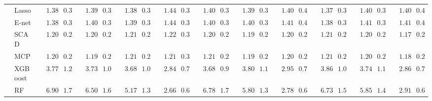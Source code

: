 \begin{tabular}{ll|ll|llllll|llllll|llllll}
 & Lasso  & $\phantom{00}1.38$ & $\phantom{0}0.33$ & $\phantom{00}1.39$ & $\phantom{0}0.36$ & $\phantom{00}1.38$ & $\phantom{0}0.39$ & $\phantom{00}1.44$ & $\phantom{0}0.36$ & $\phantom{00}1.40$ & $\phantom{0}0.33$ & $\phantom{00}1.39$ & $\phantom{0}0.33$ & $\phantom{00}1.40$ & $\phantom{0}0.44$ & $\phantom{00}1.37$ & $\phantom{0}0.36$ & $\phantom{00}1.40$ & $\phantom{0}0.38$ & $\phantom{00}1.40$ & $\phantom{0}0.40$ \\
 & E-net  & $\phantom{00}1.38$ & $\phantom{0}0.33$ & $\phantom{00}1.40$ & $\phantom{0}0.36$ & $\phantom{00}1.39$ & $\phantom{0}0.39$ & $\phantom{00}1.44$ & $\phantom{0}0.35$ & $\phantom{00}1.40$ & $\phantom{0}0.33$ & $\phantom{00}1.40$ & $\phantom{0}0.32$ & $\phantom{00}1.41$ & $\phantom{0}0.44$ & $\phantom{00}1.38$ & $\phantom{0}0.37$ & $\phantom{00}1.41$ & $\phantom{0}0.39$ & $\phantom{00}1.41$ & $\phantom{0}0.40$ \\
 & SCAD  & $\phantom{00}1.20$ & $\phantom{0}0.24$ & $\phantom{00}1.20$ & $\phantom{0}0.26$ & $\phantom{00}1.21$ & $\phantom{0}0.26$ & $\phantom{00}1.22$ & $\phantom{0}0.31$ & $\phantom{00}1.20$ & $\phantom{0}0.26$ & $\phantom{00}1.19$ & $\phantom{0}0.24$ & $\phantom{00}1.20$ & $\phantom{0}0.27$ & $\phantom{00}1.21$ & $\phantom{0}0.27$ & $\phantom{00}1.20$ & $\phantom{0}0.26$ & $\phantom{00}1.17$ & $\phantom{0}0.25$ \\
 & MCP  & $\phantom{00}1.20$ & $\phantom{0}0.25$ & $\phantom{00}1.19$ & $\phantom{0}0.26$ & $\phantom{00}1.21$ & $\phantom{0}0.26$ & $\phantom{00}1.21$ & $\phantom{0}0.30$ & $\phantom{00}1.21$ & $\phantom{0}0.27$ & $\phantom{00}1.19$ & $\phantom{0}0.24$ & $\phantom{00}1.20$ & $\phantom{0}0.27$ & $\phantom{00}1.21$ & $\phantom{0}0.27$ & $\phantom{00}1.20$ & $\phantom{0}0.25$ & $\phantom{00}1.18$ & $\phantom{0}0.26$ \\
 & XGBoost  & $\phantom{00}3.77$ & $\phantom{0}1.23$ & $\phantom{00}3.73$ & $\phantom{0}1.04$ & $\phantom{00}3.68$ & $\phantom{0}1.07$ & $\phantom{00}2.84$ & $\phantom{0}0.77$ & $\phantom{00}3.68$ & $\phantom{0}0.97$ & $\phantom{00}3.80$ & $\phantom{0}1.14$ & $\phantom{00}2.95$ & $\phantom{0}0.73$ & $\phantom{00}3.86$ & $\phantom{0}1.08$ & $\phantom{00}3.74$ & $\phantom{0}1.17$ & $\phantom{00}2.86$ & $\phantom{0}0.73$ \\
 & RF  & $\phantom{00}6.90$ & $\phantom{0}1.76$ & $\phantom{00}6.50$ & $\phantom{0}1.66$ & $\phantom{00}5.17$ & $\phantom{0}1.34$ & $\phantom{00}2.66$ & $\phantom{0}0.65$ & $\phantom{00}6.78$ & $\phantom{0}1.75$ & $\phantom{00}5.80$ & $\phantom{0}1.32$ & $\phantom{00}2.78$ & $\phantom{0}0.63$ & $\phantom{00}6.73$ & $\phantom{0}1.53$ & $\phantom{00}5.85$ & $\phantom{0}1.47$ & $\phantom{00}2.91$ & $\phantom{0}0.66$ \\

\end{tabular}
